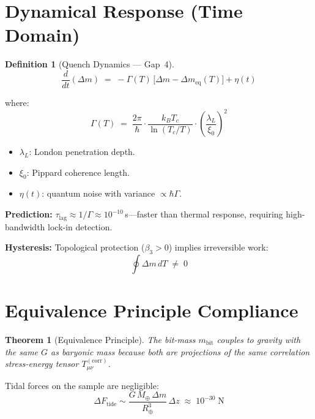 \documentclass[11pt,a4paper]{article}
\newtheorem{definition}{Definition}[section]
\newtheorem{theorem}{Theorem}[section]
\theoremstyle{remark}
\begin{document}
\section{Dynamical Response (Time Domain)}
\label{sec:dynamics}

\begin{definition}[Quench Dynamics --- Gap~4]
\begin{equation}\label{eq:quench}
    \frac{d}{dt}(\Delta m) \;=\; -\Gamma(T)\,\bigl[\Delta m - \Delta m_{\text{eq}}(T)\bigr]
        + \eta(t)
\end{equation}
\end{definition}

where:
\begin{equation}\label{eq:gamma}
    \Gamma(T) \;=\; \frac{2\pi}{\hbar}\cdot\frac{k_B T_c}{\ln(T_c/T)}
        \cdot\left(\frac{\lambda_L}{\xi_0}\right)^{\!2}
\end{equation}

\begin{itemize}[nosep]
    \item $\lambda_L$: London penetration depth.
    \item $\xi_0$: Pippard coherence length.
    \item $\eta(t)$: quantum noise with variance $\propto \hbar\Gamma$.
\end{itemize}

\textbf{Prediction:} $\tau_{\text{lag}} \approx 1/\Gamma \approx 10^{-10}$\,s---faster than thermal response, requiring high-bandwidth lock-in detection.

\textbf{Hysteresis:} Topological protection ($\beta_3 > 0$) implies irreversible work:
\begin{equation}\label{eq:hysteresis}
    \oint \Delta m\, dT \;\neq\; 0
\end{equation}

\section{Equivalence Principle Compliance}
\label{sec:equiv}

\begin{theorem}[Equivalence Principle]
The bit-mass $m_{\text{bit}}$ couples to gravity with the same $G$ as baryonic mass because both are projections of the \emph{same} correlation stress-energy tensor $T_{\mu\nu}^{(\text{corr})}$.
\end{theorem}

Tidal forces on the sample are negligible:
\begin{equation}\label{eq:tidal}
    \Delta F_{\text{tide}} \sim
    \frac{G\, M_{\oplus}\, \Delta m}{R_{\oplus}^3}\,\Delta z
    \;\approx\; 10^{-30}\;\text{N}
\end{equation}
\end{document}
